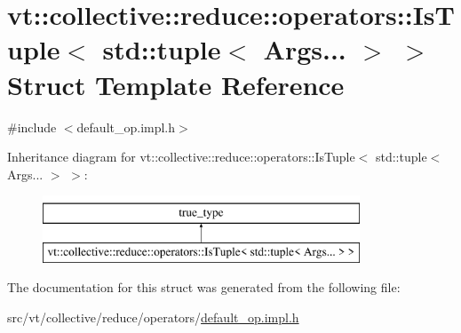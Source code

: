 \hypertarget{structvt_1_1collective_1_1reduce_1_1operators_1_1_is_tuple_3_01std_1_1tuple_3_01_args_8_8_8_01_4_01_4}{}\section{vt\+:\+:collective\+:\+:reduce\+:\+:operators\+:\+:Is\+Tuple$<$ std\+:\+:tuple$<$ Args... $>$ $>$ Struct Template Reference}
\label{structvt_1_1collective_1_1reduce_1_1operators_1_1_is_tuple_3_01std_1_1tuple_3_01_args_8_8_8_01_4_01_4}


{\ttfamily \#include $<$default\+\_\+op.\+impl.\+h$>$}

Inheritance diagram for vt\+:\+:collective\+:\+:reduce\+:\+:operators\+:\+:Is\+Tuple$<$ std\+:\+:tuple$<$ Args... $>$ $>$\+:\begin{figure}[H]
\begin{center}
\leavevmode
\includegraphics[height=2.000000cm]{structvt_1_1collective_1_1reduce_1_1operators_1_1_is_tuple_3_01std_1_1tuple_3_01_args_8_8_8_01_4_01_4}
\end{center}
\end{figure}


The documentation for this struct was generated from the following file\+:\begin{DoxyCompactItemize}
\item 
src/vt/collective/reduce/operators/\hyperlink{default__op_8impl_8h}{default\+\_\+op.\+impl.\+h}\end{DoxyCompactItemize}
